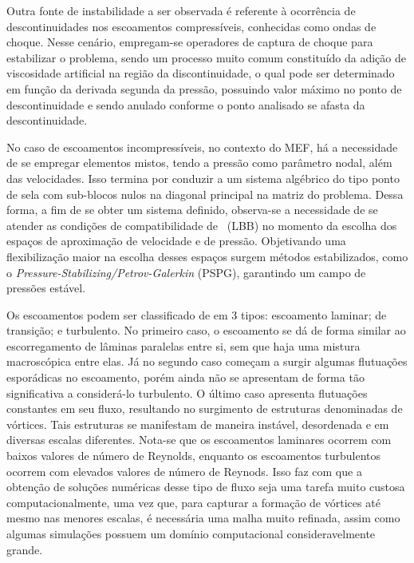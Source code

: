 Outra fonte de instabilidade a ser observada é referente à ocorrência de descontinuidades nos escoamentos compressíveis, conhecidas como ondas de choque. Nesse cenário, empregam-se operadores de captura de choque para estabilizar o problema, sendo um processo muito comum constituído da adição de viscosidade artificial na região da discontinuidade, o qual pode ser determinado em função da derivada segunda da pressão, possuindo valor máximo no ponto de descontinuidade e sendo anulado conforme o ponto analisado se afasta da descontinuidade.

No caso de escoamentos incompressíveis, no contexto do MEF, há a necessidade de se empregar elementos mistos, tendo a pressão como parâmetro nodal, além das velocidades. Isso termina por conduzir a um sistema algébrico do tipo ponto de sela com sub-blocos nulos na diagonal principal na matriz do problema. Dessa forma, a fim de se obter um sistema definido, observa-se a necessidade de se atender as condições de compatibilidade de \LBB\ (LBB) no momento da escolha dos espaços de aproximação de velocidade e de pressão. Objetivando uma flexibilização maior na escolha desses espaços surgem métodos estabilizados, como o \textit{Pressure-Stabilizing/Petrov-Galerkin} (PSPG), garantindo um campo de pressões estável.


Os escoamentos podem ser classificado de em 3 tipos: escoamento laminar; de transição; e turbulento. No primeiro caso, o escoamento se dá de forma similar ao escorregamento de lâminas paralelas entre si, sem que haja uma mistura macroscópica entre elas. Já no segundo caso começam a surgir algumas flutuações esporádicas no escoamento, porém ainda não se apresentam de forma tão significativa a considerá-lo turbulento. O último caso apresenta flutuações constantes em seu fluxo, resultando no surgimento de estruturas denominadas de vórtices. Tais estruturas se manifestam de maneira instável, desordenada e em diversas escalas diferentes. Nota-se que os escoamentos laminares ocorrem com baixos valores de número de Reynolds, enquanto os escoamentos turbulentos ocorrem com elevados valores de número de Reynods. Isso faz com que a obtenção de soluções numéricas desse tipo de fluxo seja uma tarefa muito custosa computacionalmente, uma vez que, para capturar a formação de vórtices até mesmo nas menores escalas, é necessária uma malha muito refinada, assim como algumas simulações possuem um domínio computacional consideravelmente grande.

